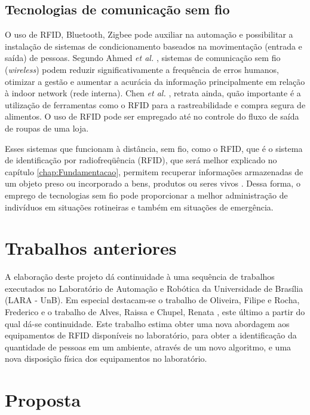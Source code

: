 \subsection{Tecnologias de comunicação sem fio}

O uso de RFID, Bluetooth, Zigbee pode auxiliar na automação e possibilitar a instalação de sistemas de condicionamento baseados na movimentação (entrada e saída) de pessoas. Segundo Ahmed \textit{et al.} \cite{AhmedIntegrationStreamMapping}, sistemas de comunicação sem fio (\textit{wireless}) podem reduzir significativamente a frequência de erros humanos, otimizar a gestão e aumentar a acurácia da informação principalmente em relação à indoor network (rede interna). Chen \textit{et al.} \cite{chenUsingRFID}, retrata ainda, quão importante é a utilização de ferramentas como o RFID para a rastreabilidade e compra segura de alimentos. O uso de RFID pode ser empregado até no controle do fluxo de saída de roupas de uma loja.

Esses sistemas que funcionam à distância, sem fio, como o RFID, que é o sistema de identificação por radiofreqüência (RFID), que será melhor explicado no capítulo \ref{chap:Fundamentacao}, permitem recuperar informações armazenadas de um objeto preso ou incorporado a bens, produtos ou seres vivos \cite{gutierrez2005complexo}. Dessa forma, o emprego de tecnologias sem fio pode proporcionar a melhor administração de indivíduos em situações rotineiras e também em situações de emergência. 

\section{Trabalhos anteriores}

A elaboração deste projeto dá continuidade à uma sequência de trabalhos executados no Laboratório de Automação e Robótica da Universidade de Brasília (LARA - UnB). Em especial destacam-se o trabalho de Oliveira, Filipe e Rocha, Frederico \cite{TG2013OliveiraERocha} e o trabalho de Alves, Raissa e Chupel, Renata \cite{TG2015RaissaERenata}, este último a partir do qual dá-se continuidade.
Este trabalho estima obter uma nova abordagem aos equipamentos de RFID disponíveis no laboratório, para obter a identificação da quantidade de pessoas em um ambiente, através de um novo algoritmo, e uma nova disposição física dos equipamentos no laboratório.

\section{Proposta}

